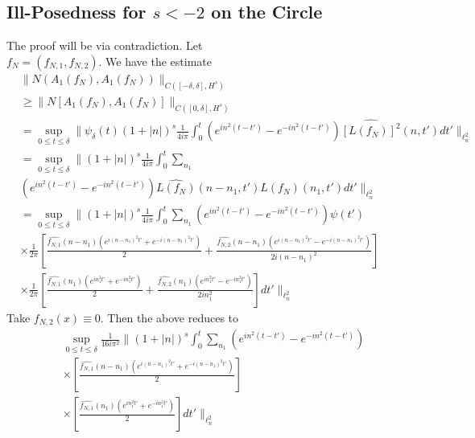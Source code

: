 \documentclass[12pt,reqno]{amsart}
\numberwithin{equation}{section}  %
\newcommand{\wh}{\widehat}
\begin{document}
\subsection{Ill-Posedness for $s < -2$ on the Circle} 
\label{ssec:circle-ill-pos}
%
The proof will be via contradiction. Let \\ $f_{N} = (f_{N,1},
f_{N,2})$. We have the estimate
%
%
\begin{equation*}
\begin{split}
  & \| N(A_{1}(f_{N}), A_{1}(f_{N})) \|_{C([-\delta, \delta],
  H^{s})}
  \\
 & \ge
  \| N[A_{1}(f_{N}), A_{1}(f_{N})] \|_{C([0, \delta],
  H^{s})} 
  \\
  & = \sup_{0 \le t \le \delta} \| \psi_{\delta}(t) (1 + | n |)^{s}
  \frac{1}{4 i \pi}
  \int_{0}^{t} \left( e^{in^{2}(t-t')} - e^{-in^{2}(t-t')} \right)
  \wh{[L(f_{N})]^{2}}(n, t') dt' \|_{\ell^{2}_{n}}
  \\
  & = \sup_{0 \le t \le \delta} \| (1 + | n |)^{s} \frac{1}{4 i \pi} 
  \int_{0}^{t} \sum_{n_{1}}
  \\
  & \left( e^{in^{2}(t-t')} - e^{-in^{2}(t-t')} \right)
  \wh{L(f_{N})}(n - n_{1}, t')\wh{L(f_{N})}(n_{1}, t') dt'
  \|_{\ell^{2}_{n}}
  \\
  & = \sup_{0 \le t \le \delta} \| (1 + | n |)^{s} \frac{1}{4 i \pi} 
  \int_{0}^{t} \sum_{n_{1}} \left( e^{in^{2}(t-t')} - e^{-in^{2}(t-t')} \right)
  \psi(t')
  \\
  & \times \frac{1}{2 \pi} \left[ \frac{\wh{f_{N,1}}(n - n_{1})\left( e^{i(n - n_{1})^{2}t'} +
  e^{-i(n - n_{1})^{2}t'} \right)}{2} + \frac{\wh{f_{N,2}}(n - n_{1})\left(
  e^{i(n - n_{1})^{2}t'} - e^{-i(n - n_{1})^{2}t'}
  \right)}{2i(n - n_{1})^{2}} \right]
  \\
  & \times \frac{1}{2 \pi} \left[ \frac{\wh{f_{N,1}}(n_{1})\left( e^{in_{1}^{2}t'} +
  e^{-in_{1}^{2}t'} \right)}{2} + \frac{\wh{f_{N,2}}(n_{1})\left(
  e^{in_{1}^{2}t'} - e^{-in_{1}^{2}t'}
  \right)}{2 i n_{1}^{2}} \right]
  dt' \|_{\ell^{2}_{n}}
\end{split}
\end{equation*}
%
Take $f_{N,2}(x) \equiv 0$. Then the above reduces to
%
%
\begin{equation*}
\begin{split}
  & \sup_{0 \le t \le \delta} \frac{1}{16 i \pi^{2}}\| (1 + | n |)^{s}
  \int_{0}^{t} \sum_{n_{1}} \left( e^{in^{2}(t-t')} - e^{-in^{2}(t-t')} \right)
  \\
  & \times \left[ \frac{\wh{f_{N,1}}(n - n_{1})\left( e^{i(n - n_{1})^{2}t'} +
  e^{-i(n - n_{1})^{2}t'} \right)}{2} \right ]
  \\
  & \times \left[ \frac{\wh{f_{N,1}}(n_{1})\left( e^{in_{1}^{2}t'} +
  e^{-in_{1}^{2}t'} \right)}{2}  \right]
  dt' \|_{\ell^{2}_{n}}
\end{split}
\end{equation*}
\end{document}
